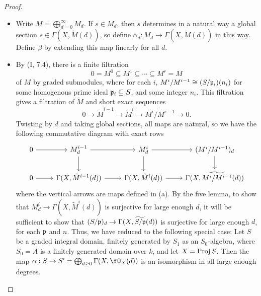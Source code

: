 \documentclass[a4paper]{article}
\begin{document}
\begin{enumerate} [label=\textbf{\arabic*.}, leftmargin=0em]
\begin{proof} $ $ \vspace{0pt}
    \begin{itemize} [leftmargin=0cm]
        \item[(a)] Write $M = \bigoplus_{d = 0}^\infty M_d$. If $s \in M_d$, then $s$ determines in a natural way a global section $s \in \Gamma(X, \tilde{M}(d))$, so define $\alpha_d : M_d \to \Gamma(X, \tilde{M}(d))$ in this way. Define $\beta$ by extending this map linearly for all $d$.

        \item[(b)] By (I, 7.4), there is a finite filtration
        \begin{equation*}
            0 = M^0 \subseteq M^1 \subseteq \cdots \subseteq M^r = M
        \end{equation*}
        of $M$ by graded submodules, where for each $i$, $M^i / M^{i - 1} \cong (S / \mathfrak{p}_i)(n_i)$ for some homogenous prime ideal $\mathfrak{p}_i \subseteq S$, and some integer $n_i$. This filtration gives a filtration of $\tilde{M}$ and short exact sequences
        \begin{equation*}
            0 \to \tilde{M}^{i - 1} \to \tilde{M}^i \to \widetilde{M^i / M^{i - 1}} \to 0.
        \end{equation*}
        Twisting by $d$ and taking global sections, all maps are natural, so we have the following commutative diagram with exact rows
        \[ \begin{tikzcd}
            0 \arrow[r] & M_d^{i-1} \arrow[d] \arrow[r]         & M_d^i \arrow[d] \arrow[r]         & (M^i/M^{i-1})_d \arrow[d]             \\
            0 \arrow[r] & \Gamma(X, \tilde{M}^{i-1}(d)) \arrow[r] & \Gamma(X,\tilde{M}^i(d)) \arrow[r] & \Gamma(X, \widetilde{M^i/M^{i-1}}(d))
            \end{tikzcd} \]
        where the vertical arrows are maps defined in (a). By the five lemma, to show that $M_d^i \to \Gamma(X, \tilde{M}^i(d))$ is surjective for large enough $d$, it will be sufficient to show that $(S/\mathfrak{p})_d \to \Gamma(X, \widetilde{S/\mathfrak{p}}(d))$ is surjective for large enough $d$, for each $\mathfrak{p}$ and $n$.  Thus, we have reduced to the following special case: Let $S$ be a graded integral domain, finitely generated by $S_1$ as an $S_0$-algebra, where $S_0 = A$ is a finitely generated domain over $k$, and let $X = \operatorname{Proj}{S}$. Then the map $\alpha : S \to S' = \bigoplus_{d \geq 0} \Gamma(X, \fO_X(d))$ is an isomorphism in all large enough degrees.


\end{itemize}
\end{proof}
\end{enumerate}
\end{document}
